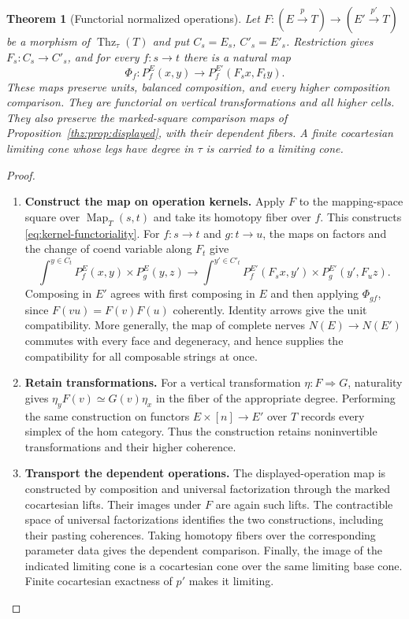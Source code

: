 \documentclass[oneside]{article}
\theoremstyle{plain}
\newtheorem{theorem}{Theorem}[section]
\theoremstyle{definition}
\theoremstyle{remark}
\newcommand{\Map}{\operatorname{Map}}
\newcommand{\Thz}{\operatorname{Thz}}
\begin{document}
\begin{theorem}[Functorial normalized operations]
\label{thz:thm:kernel-functoriality}
Let $F:(E\xrightarrow pT)\to(E'\xrightarrow{p'}T)$ be a morphism of
$\Thz_\tau(T)$ and put $C_s=E_s$, $C'_s=E'_s$.
Restriction gives $F_s:C_s\to C'_s$, and for every $f:s\to t$ there is
a natural map
\begin{equation}\label{eq:kernel-functoriality}
 \Phi_f:P_f^E(x,y)\longrightarrow P_f^{E'}(F_sx,F_ty).
\end{equation}
These maps preserve units, balanced composition, and every higher
composition comparison. They are functorial on vertical transformations
and all higher cells. They also preserve the marked-square comparison
maps of Proposition~\ref{thz:prop:displayed}, with their dependent fibers.
A finite cocartesian limiting cone whose legs have degree in $\tau$ is
carried to a limiting cone.
\end{theorem}
\begin{proof}
\leavevmode
\begin{enumerate}
\item \textbf{Construct the map on operation kernels.}
Apply $F$ to the mapping-space square over $\Map_T(s,t)$ and take its
homotopy fiber over $f$. This constructs \eqref{eq:kernel-functoriality}.
For $f:s\to t$ and $g:t\to u$, the maps on factors and the change of
coend variable along $F_t$ give
\[
 \int^{y\in C_t}P_f^E(x,y)\times P_g^E(y,z)
 \longrightarrow
 \int^{y'\in C'_t}
 P_f^{E'}(F_sx,y')\times P_g^{E'}(y',F_uz).
\]
Composing in $E'$ agrees with first composing in $E$ and then applying
$\Phi_{gf}$, since $F(vu)=F(v)F(u)$ coherently. Identity arrows give
the unit compatibility. More generally, the map of complete nerves
$N(E)\to N(E')$ commutes with every face and degeneracy, and hence
supplies the compatibility for all composable strings at once.


\item \textbf{Retain transformations.}
For a vertical transformation $\eta:F\Rightarrow G$, naturality gives
$\eta_yF(v)\simeq G(v)\eta_x$ in the fiber of the appropriate degree.
Performing the same construction on functors $E\times[n]\to E'$ over
$T$ records every simplex of the hom category. Thus the construction
retains noninvertible transformations and their higher coherence.


\item \textbf{Transport the dependent operations.}
The displayed-operation map is constructed by composition and universal
factorization through the marked cocartesian lifts. Their images under
$F$ are again such lifts. The contractible space of universal
factorizations identifies the two constructions, including their
pasting coherences. Taking homotopy fibers over the corresponding
parameter data gives the dependent comparison. Finally, the image of
the indicated limiting cone is a cocartesian cone over the same limiting
base cone. Finite cocartesian exactness of $p'$ makes it limiting.
\qedhere
\end{enumerate}
\end{proof}
\end{document}
